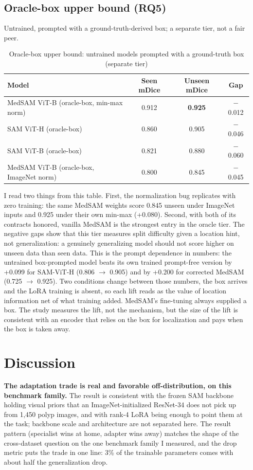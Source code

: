 \documentclass[conference]{IEEEtran}
\begin{document}
\subsection{Oracle-box upper bound (RQ5)}\label{sec:6.4}
Untrained, prompted with a ground-truth-derived box; a separate tier, not a fair peer.

\begin{table}[t]
\centering
\footnotesize
\caption{Oracle-box upper bound: untrained models prompted with a ground-truth box (separate tier)}
\label{tab:7}
\begin{tabular}{lccc}
\hline
\textbf{Model} & \textbf{Seen mDice} & \textbf{Unseen mDice} & \textbf{Gap} \\
\hline
MedSAM ViT-B (oracle-box, min-max norm) & 0.912 & \textbf{0.925} & $-$0.012 \\
SAM ViT-H (oracle-box) & 0.860 & 0.905 & $-$0.046 \\
SAM ViT-B (oracle-box) & 0.821 & 0.880 & $-$0.060 \\
MedSAM ViT-B (oracle-box, ImageNet norm) & 0.800 & 0.845 & $-$0.045 \\
\hline
\end{tabular}
\end{table}

I read two things from this table. First, the normalization bug replicates with zero training: the same MedSAM weights score 0.845 unseen under ImageNet inputs and 0.925 under their own min-max (+0.080). Second, with both of its contracts honored, vanilla MedSAM is the strongest entry in the oracle tier. The negative gaps show that this tier measures split difficulty given a location hint, not generalization: a genuinely generalizing model should not score higher on unseen data than seen data. This is the prompt dependence in numbers: the untrained box-prompted model beats its own trained prompt-free version by +0.099 for SAM-ViT-H (0.806 $\rightarrow$ 0.905) and by +0.200 for corrected MedSAM (0.725 $\rightarrow$ 0.925). Two conditions change between those numbers, the box arrives and the LoRA training is absent, so each lift reads as the value of location information net of what training added. MedSAM's fine-tuning always supplied a box. The study measures the lift, not the mechanism, but the size of the lift is consistent with an encoder that relies on the box for localization and pays when the box is taken away.


\section{Discussion}\label{sec:7}
\textbf{The adaptation trade is real and favorable off-distribution, on this benchmark family.} The result is consistent with the frozen SAM backbone holding visual priors that an ImageNet-initialized ResNet-34 does not pick up from 1,450 polyp images, and with rank-4 LoRA being enough to point them at the task; backbone scale and architecture are not separated here. The result pattern (specialist wins at home, adapter wins away) matches the shape of the cross-dataset question on the one benchmark family I measured, and the drop metric puts the trade in one line: 3\% of the trainable parameters comes with about half the generalization drop.
\end{document}
